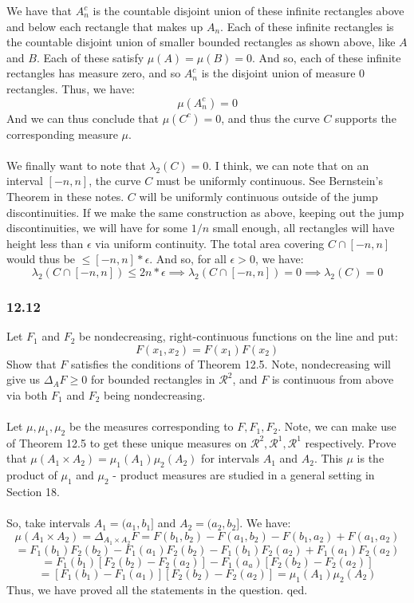 \documentclass[12pt,a4paper]{article}
\newcommand{\1}[1]{\mathbbm{1}\left\{ #1 \right\}}
\newcommand{\rcal}{\mathcal{R}}
\begin{document}
We have that $A_n^c$ is the countable disjoint union of these infinite rectangles above and below each rectangle that makes up $A_n$. Each of these infinite rectangles is the countable disjoint union of smaller bounded rectangles as shown above, like $A$ and $B$. Each of these satisfy $\mu(A) = \mu(B) = 0$. And so, each of these infinite rectangles has measure zero, and so $A_n^c$ is the disjoint union of measure 0 rectangles. Thus, we have:
$$
	\mu(A_n^c) = 0
$$
And we can thus conclude that $\mu(C^c) = 0$, and thus the curve $C$ supports the corresponding measure $\mu$.
\\\\
We finally want to note that $\lambda_2(C) = 0$. I think, we can note that on an interval $[-n,n]$, the curve $C$ must be uniformly continuous. See Bernstein's Theorem in these notes. $C$ will be uniformly continuous outside of the jump discontinuities. If we make the same construction as above, keeping out the jump discontinuities, we will have for some $1/n$ small enough, all rectangles will have height less than $\epsilon$ via uniform continuity. The total area covering $C \cap [-n,n]$ would thus be $\leq [-n,n] * \epsilon$. And so, for all $\epsilon > 0$, we have:
$$
	\lambda_2(C \cap [-n,n]) \leq 2n * \epsilon \implies
	\lambda_2(C \cap [-n,n]) = 0 \implies
	\lambda_2(C) = 0
$$

\subsubsection{12.12} Let $F_1$ and $F_2$ be nondecreasing, right-continuous functions on the line and put:
$$
	F(x_1,x_2) = F(x_1)F(x_2)
$$
Show that $F$ satisfies the conditions of Theorem 12.5. Note, nondecreasing will give us $\Delta_AF \geq 0$ for bounded rectangles in $\rcal^2$, and $F$ is continuous from above via both $F_1$ and $F_2$ being nondecreasing.
\\\\
Let $\mu,\mu_1,\mu_2$ be the measures corresponding to $F,F_1,F_2$. Note, we can make use of Theorem 12.5 to get these unique measures on $\rcal^2,\rcal^1,\rcal^1$ respectively. Prove that $\mu(A_1 \times A_2) = \mu_1(A_1)\mu_2(A_2)$ for intervals $A_1$ and $A_2$. This $\mu$ is the product of $\mu_1$ and $\mu_2$ - product measures are studied in a general setting in Section 18.
\\\\
So, take intervals $A_1 = (a_1,b_1]$ and $A_2 = (a_2,b_2]$. We have:
$$
	\mu(A_1 \times A_2) =
	\Delta_{A_1 \times A_2}F =
	F(b_1,b_2) - F(a_1,b_2) - F(b_1,a_2) + F(a_1,a_2)
$$
$$
	= F_1(b_1)F_2(b_2) - F_1(a_1)F_2(b_2) - F_1(b_1)F_2(a_2) + F_1(a_1)F_2(a_2) 
$$
$$
	= F_1(b_1)\left[F_2(b_2) - F_2(a_2)\right] - F_1(a_a)\left[F_2(b_2) - F_2(a_2)\right]
$$
$$
	= \left[F_1(b_1) - F_1(a_1)\right]\left[F_2(b_2) - F_2(a_2)\right] = \mu_1(A_1)\mu_2(A_2)
$$
Thus, we have proved all the statements in the question. qed.
\end{document}

